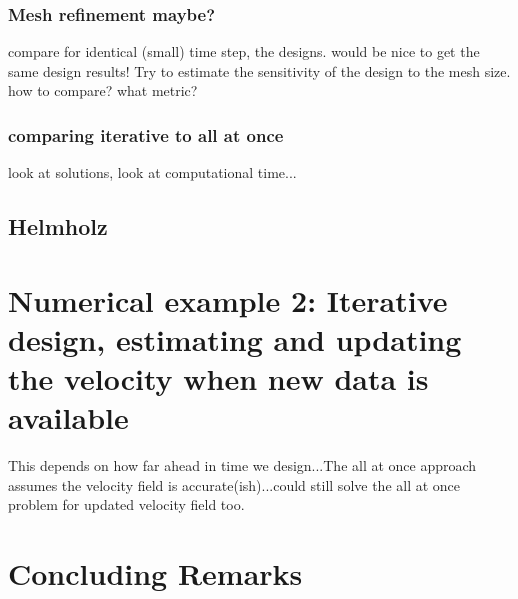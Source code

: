 \documentclass[12pt]{article}
\begin{document}
\subsubsection{Mesh refinement maybe?}
compare for identical (small) time step, the designs. would be nice to get the same design results! Try to estimate the sensitivity of the design to the mesh size. how to compare? what metric?

\subsubsection{comparing iterative to all at once}
look at solutions, look at computational time...

\subsection{Helmholz}







\section{Numerical example 2: Iterative design, estimating and updating the velocity when new data is available } 
This depends on how far ahead in time we design...The all at once approach assumes the velocity field is accurate(ish)...could still solve the all at once problem for updated velocity field too. 



\section{Concluding Remarks}








\end{document}
